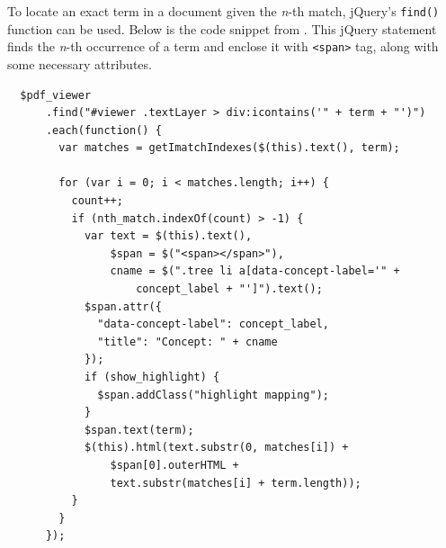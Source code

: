 To locate an exact term in a document given the \textit{n}-th match, jQuery's \texttt{find()} function can be used. Below is the code snippet from . This jQuery statement finds the \textit{n}-th occurrence of a term and enclose it with \texttt{<span>} tag, along with some necessary attributes.

\begin{verbatim}
  $pdf_viewer
      .find("#viewer .textLayer > div:icontains('" + term + "')")
      .each(function() {
        var matches = getImatchIndexes($(this).text(), term);

        for (var i = 0; i < matches.length; i++) {
          count++;
          if (nth_match.indexOf(count) > -1) {
            var text = $(this).text(),
                $span = $("<span></span>"),
                cname = $(".tree li a[data-concept-label='" + 
                    concept_label + "']").text();
            $span.attr({
              "data-concept-label": concept_label,
              "title": "Concept: " + cname
            });
            if (show_highlight) {
              $span.addClass("highlight mapping");
            }
            $span.text(term);
            $(this).html(text.substr(0, matches[i]) + 
                $span[0].outerHTML + 
                text.substr(matches[i] + term.length));
          }
        }
      });
\end{verbatim}
